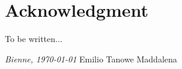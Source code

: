 \chapter*{Acknowledgment}

To be written... 
%
%
%
%
%


\bigskip
 
\noindent\textit{Bienne, \today}
\hfill Emilio Tanowe Maddalena
